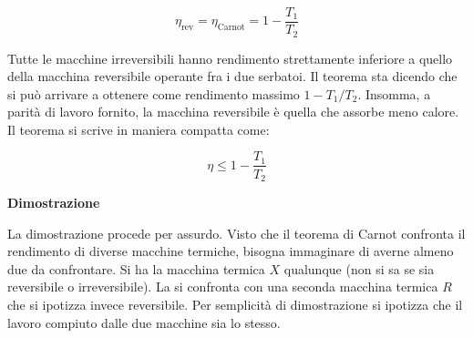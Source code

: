 \[
	\eta_{\text{rev} } = \eta_{\text{Carnot} } = 1 - \frac{T_1 }{T_2 }
\]

Tutte le macchine irreversibili hanno rendimento strettamente inferiore a quello della macchina reversibile operante fra i due serbatoi. Il teorema sta dicendo che si può arrivare a ottenere come rendimento massimo $1-T_1/T_2$.
Insomma, a parità di lavoro fornito, la macchina reversibile è quella che assorbe meno calore. Il teorema si scrive in maniera compatta come:

\[
	\boxed{\eta \le 1-\frac{T_1}{T_2}}
\]

\textbf{Dimostrazione}

La dimostrazione procede per assurdo. Visto che il teorema di Carnot confronta il rendimento di diverse macchine termiche, bisogna immaginare di averne almeno due da confrontare. Si ha la macchina termica $X$ qualunque (non si sa se sia reversibile o irreversibile). La si confronta con una seconda macchina termica $R$ che si ipotizza invece reversibile. Per semplicità di dimostrazione si ipotizza che il lavoro compiuto dalle due macchine sia lo stesso.

